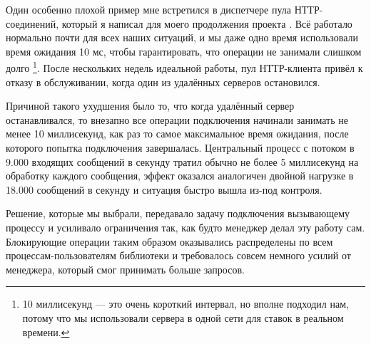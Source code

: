 \documentclass[11pt, oneside]{book}   	%
\begin{document}
Один особенно плохой пример мне встретился в диспетчере пула НТТР-соединений,  который я написал для моего продолжения проекта \href{https://github.com/ferd/lhttpc}{}. Всё работало нормально почти для всех наших ситуаций, и мы даже одно время использовали время ожидания 10 мс, чтобы гарантировать, что операции не занимали слишком долго \footnote{10 миллисекунд --- это очень короткий интервал, но вполне подходил нам, потому что мы использовали сервера в одной сети для ставок в реальном времени.}. После нескольких недель идеальной работы, пул НТТР-клиента привёл к отказу в обслуживании, когда один из удалённых серверов остановился.

Причиной такого ухудшения было то, что когда удалённый сервер останавливался, то внезапно все операции подключения начинали занимать не менее 10 миллисекунд, как раз то самое максимальное время ожидания, после которого попытка подключения завершалась. Центральный процесс с потоком в 9.000 входящих сообщений в секунду тратил обычно не более 5 миллисекунд на обработку каждого сообщения, эффект оказался аналогичен двойной нагрузке в 18.000 сообщений в секунду и ситуация быстро вышла из-под контроля.

Решение, которые мы выбрали, передавало задачу подключения вызывающему процессу и усиливало ограничения так, как будто менеджер делал эту работу сам. Блокирующие операции таким образом оказывались распределены по всем процессам-пользователям библиотеки и требовалось совсем немного усилий от менеджера, который смог принимать больше запросов.
\end{document}
